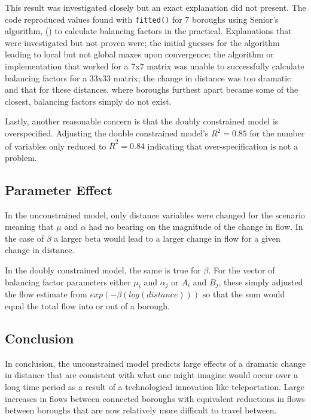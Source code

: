 \documentclass[11pt]{article} %
\begin{document}
This result was investigated closely but an exact explanation did not present. The code reproduced values found with \verb!fitted()! for 7 boroughs using Senior's algorithm, (\cite{senior1979gravity}) to calculate balancing factors in the practical. Explanations that were investigated but not proven were; the initial guesses for the algorithm leading to local but not global maxes upon convergence; the algorithm or implementation that worked for a 7x7 matrix was unable to successfully calculate balancing factors for a 33x33 matrix; the change in distance was too dramatic and that for these distances, where boroughs furthest apart became some of the closest, balancing factors simply do not exist. 

Lastly, another reasonable concern is that the doubly constrained model is overspecified. Adjusting the double constrained model's $R^2 = 0.85$ for the number of variables only reduced to $\bar{R}^2 = 0.84$ indicating that over-specification is not a problem.  

\subsection{Parameter Effect}

In the unconstrained model, only distance variables were changed for the scenario meaning that $\mu$ and $\alpha$ had no bearing on the magnitude of the change in flow. In the case of $\beta$ a larger beta would lead to a larger change in flow for a given change in distance. 

In the doubly constrained model, the same is true for $\beta$. For the vector of balancing factor parameters either $\mu_i$ and $\alpha_j$ or $A_i$ and $B_j$, these simply adjusted the flow estimate from $exp(-\beta (log(distance)))$ so that the sum would equal the total flow into or out of a borough. 

\subsection{Conclusion}

In conclusion, the unconstrained model predicts large effects of a dramatic change in distance that are consistent with what one might imagine would occur over a long time period as a result of a technological innovation like teleportation. Large increases in flows between connected boroughs with equivalent reductions in flows between boroughs that are now relatively more difficult to travel between. 
\end{document}

